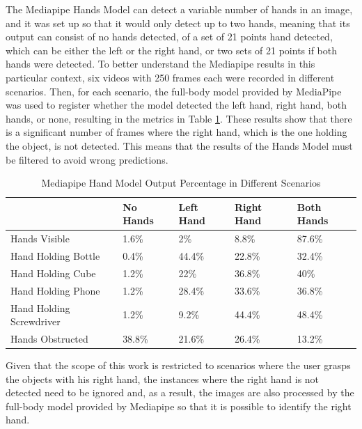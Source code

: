 The Mediapipe Hands Model can detect a variable number of hands in an image, and it was set up so that it would only detect up to two hands, meaning that its output can consist of no hands detected, of a set of 21 points hand detected, which can be either the left or the right hand, or two sets of 21 points if both hands were detected. To better understand the Mediapipe results in this particular context, six videos with 250 frames each were recorded in different scenarios. Then, for each scenario, the full-body model provided by MediaPipe was used to register whether the model detected the left hand, right hand, both hands, or none, resulting in the metrics in Table \ref{table:mediapipe_metrics}. These results show that there is a significant number of frames where the right hand, which is the one holding the object, is not detected. This means that the results of the Hands Model must be filtered to avoid wrong predictions.

\begin{table}[H]
    \centering
    \caption{Mediapipe Hand Model Output Percentage in Different Scenarios}
    \label{table:mediapipe_metrics}
    \begin{tabular}{|l|l|l|l|l|}
        \hline
        & No Hands & Left Hand & Right Hand & Both Hands \\
        \hline
        Hands Visible & 1.6\% & 2\% & 8.8\% & 87.6\% \\
        \hline
        Hand Holding Bottle & 0.4\% & 44.4\% & 22.8\% & 32.4\% \\
        \hline
        Hand Holding Cube & 1.2\% & 22\% & 36.8\% & 40\% \\
        \hline
        Hand Holding Phone & 1.2\% & 28.4\% & 33.6\% & 36.8\% \\
        \hline
        Hand Holding Screwdriver & 1.2\% & 9.2\% & 44.4\% & 48.4\% \\
        \hline
        Hands Obstructed & 38.8\% & 21.6\% & 26.4\% & 13.2\% \\
        \hline
    \end{tabular}
\end{table}

Given that the scope of this work is restricted to scenarios where the user grasps the objects with his right hand, the instances where the right hand is not detected need to be ignored and, as a result, the images are also processed by the full-body model provided by Mediapipe so that it is possible to identify the right hand.

